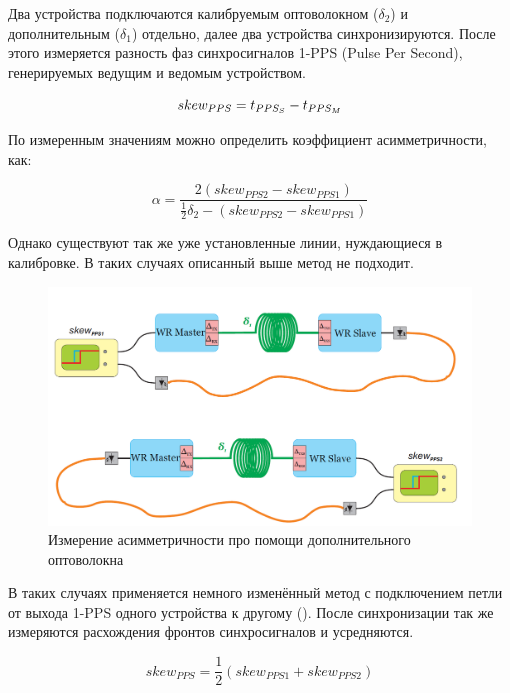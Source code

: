 Два устройства подключаются калибруемым оптоволокном ($\delta_{2}$) и дополнительным ($\delta_{1}$) отдельно, 
далее два устройства синхронизируются. После этого измеряется разность фаз синхросигналов 1-PPS
(Pulse Per Second), генерируемых ведущим и ведомым устройством. 

\begin{equation}
	skew_{PPS} = t_{PPS_S} - t_{PPS_M}\\
\end{equation}

По измеренным значениям можно определить коэффициент асимметричности, как:

\begin{equation}
	\label{eq:alpha}
	\alpha = \frac{2 \left( skew_{PPS2} - skew_{PPS1} \right) }{\frac{1}{2} \delta_2 - \left( skew_{PPS2} - skew_{PPS1} \right)}
\end{equation}


Однако существуют так же уже установленные линии, нуждающиеся в калибровке. В таких случаях описанный выше метод не подходит.

\begin{figure}[ht!] 
	\center
	\includegraphics [scale=0.4] {my_folder/images//meas_scheme_2}
	\caption{Измерение асимметричности про помощи дополнительного оптоволокна} 
	\label{fig:meas-scheme-2}  
\end{figure}

В таких случаях применяется немного изменённый метод с подключением петли от выхода 1-PPS одного устройства к другому (). 
После синхронизации так же измеряются расхождения фронтов синхросигналов и усредняются.

\begin{equation}
	skew_{PPS} = \frac{1}{2} \left(skew_{PPS1} + skew_{PPS2} \right)
\end{equation}

